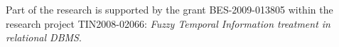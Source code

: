 %
%
Part of the research is supported by the grant BES-2009-013805 within the research project TIN2008-02066: \emph{Fuzzy Temporal Information treatment in relational DBMS}.